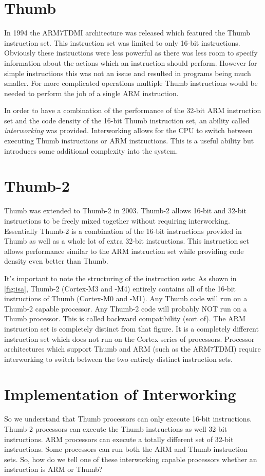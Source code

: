 \section{Thumb}
In 1994 the ARM7TDMI architecture was released which featured the Thumb instruction set. This instruction set was limited to only 16-bit instructions. Obviously these instructions were less powerful as there was less room to specify information about the actions which an instruction should perform. However for simple instructions this was not an issue and resulted in programs being much smaller. For more complicated operations multiple Thumb instructions would be needed to perform the job of a single ARM instruction. 

In order to have a combination of the performance of the 32-bit ARM instruction set and the code density of the 16-bit Thumb instruction set, an ability called \emph{interworking} was provided. Interworking allows for the CPU to switch between executing Thumb instructions or ARM instructions. This is a useful ability but introduces some additional complexity into the system.

\section{Thumb-2}
Thumb was extended to Thumb-2 in 2003. Thumb-2 allows 16-bit and 32-bit instructions to be freely mixed together without requiring interworking. Essentially Thumb-2 is a combination of the 16-bit instructions provided in Thumb as well as a whole lot of extra 32-bit instructions. This instruction set allows performance similar to the ARM instruction set while providing code density even better than Thumb. 

It's important to note the structuring of the instruction sets: As shown in \autoref{fig:isa}, Thumb-2 (Cortex-M3 and -M4) entirely contains all of the 16-bit instructions of Thumb (Cortex-M0 and -M1). Any Thumb code will run on a Thumb-2 capable processor. Any Thumb-2 code will probably NOT run on a Thumb processor. This is called backward compatibility (sort of). The ARM instruction set is completely distinct from that figure. It is a completely different instruction set which does not run on the Cortex series of processors. Processor architectures which support Thumb and ARM (such as the ARM7TDMI) require interworking to switch between the two entirely distinct instruction sets.

\section{Implementation of Interworking}
So we understand that Thumb processors can only execute 16-bit instructions. Thumb-2 processors can execute the Thumb instructions as well 32-bit instructions. ARM processors can execute a totally different set of 32-bit instructions. Some processors can run both the ARM and Thumb instruction sets. So, how do we tell one of these interworking capable processors whether an instruction is ARM or Thumb?

